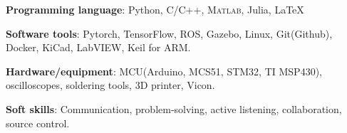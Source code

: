 \textbf{Programming language}: Python, C/C++, \textsc{Matlab}, Julia, \LaTeX

\textbf{Software tools}: Pytorch, TensorFlow, ROS, Gazebo, Linux, Git(Github), Docker, KiCad, LabVIEW, Keil for ARM.

\textbf{Hardware/equipment}: MCU(Arduino, MCS51, STM32, TI MSP430), oscilloscopes, soldering tools, 3D printer, Vicon.

\textbf{Soft skills}: Communication, problem-solving, active listening, collaboration, source control.